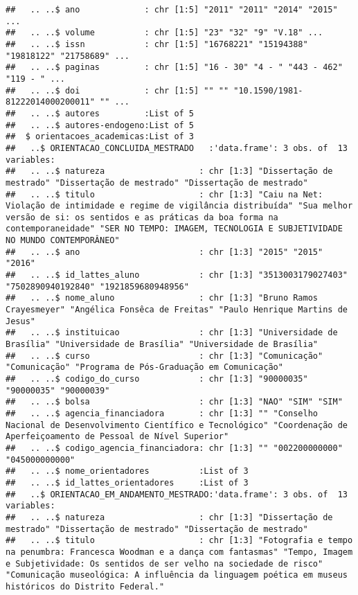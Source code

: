 \documentclass[]{article}
\begin{document}
\begin{verbatim}
##   .. ..$ ano             : chr [1:5] "2011" "2011" "2014" "2015" ...
##   .. ..$ volume          : chr [1:5] "23" "32" "9" "V.18" ...
##   .. ..$ issn            : chr [1:5] "16768221" "15194388" "19818122" "21758689" ...
##   .. ..$ paginas         : chr [1:5] "16 - 30" "4 - " "443 - 462" "119 - " ...
##   .. ..$ doi             : chr [1:5] "" "" "10.1590/1981-81222014000200011" "" ...
##   .. ..$ autores         :List of 5
##   .. ..$ autores-endogeno:List of 5
##  $ orientacoes_academicas:List of 3
##   ..$ ORIENTACAO_CONCLUIDA_MESTRADO   :'data.frame': 3 obs. of  13 variables:
##   .. ..$ natureza                   : chr [1:3] "Dissertação de mestrado" "Dissertação de mestrado" "Dissertação de mestrado"
##   .. ..$ titulo                     : chr [1:3] "Caiu na Net: Violação de intimidade e regime de vigilância distribuída" "Sua melhor versão de si: os sentidos e as práticas da boa forma na contemporaneidade" "SER NO TEMPO: IMAGEM, TECNOLOGIA E SUBJETIVIDADE NO MUNDO CONTEMPORÂNEO"
##   .. ..$ ano                        : chr [1:3] "2015" "2015" "2016"
##   .. ..$ id_lattes_aluno            : chr [1:3] "3513003179027403" "7502890940192840" "1921859680948956"
##   .. ..$ nome_aluno                 : chr [1:3] "Bruno Ramos Crayesmeyer" "Angélica Fonsêca de Freitas" "Paulo Henrique Martins de Jesus"
##   .. ..$ instituicao                : chr [1:3] "Universidade de Brasília" "Universidade de Brasília" "Universidade de Brasília"
##   .. ..$ curso                      : chr [1:3] "Comunicação" "Comunicação" "Programa de Pós-Graduação em Comunicação"
##   .. ..$ codigo_do_curso            : chr [1:3] "90000035" "90000035" "90000039"
##   .. ..$ bolsa                      : chr [1:3] "NAO" "SIM" "SIM"
##   .. ..$ agencia_financiadora       : chr [1:3] "" "Conselho Nacional de Desenvolvimento Científico e Tecnológico" "Coordenação de Aperfeiçoamento de Pessoal de Nível Superior"
##   .. ..$ codigo_agencia_financiadora: chr [1:3] "" "002200000000" "045000000000"
##   .. ..$ nome_orientadores          :List of 3
##   .. ..$ id_lattes_orientadores     :List of 3
##   ..$ ORIENTACAO_EM_ANDAMENTO_MESTRADO:'data.frame': 3 obs. of  13 variables:
##   .. ..$ natureza                   : chr [1:3] "Dissertação de mestrado" "Dissertação de mestrado" "Dissertação de mestrado"
##   .. ..$ titulo                     : chr [1:3] "Fotografia e tempo na penumbra: Francesca Woodman e a dança com fantasmas" "Tempo, Imagem e Subjetividade: Os sentidos de ser velho na sociedade de risco" "Comunicação museológica: A influência da linguagem poética em museus históricos do Distrito Federal."

\end{verbatim}
\end{document}
